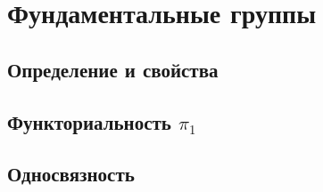 \section{Фундаментальные группы}
\begin{Intro}
    
\end{Intro}
\subsection{Определение и свойства}
\subsection{Функториальность $\pi_1$ }
\subsection{Односвязность}

